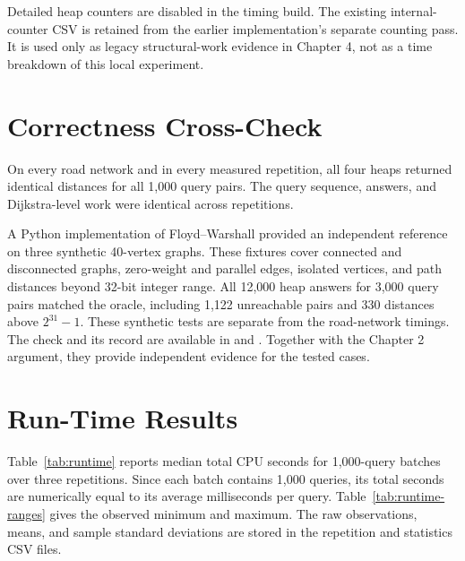\documentclass[12pt,a4paper]{report}
\begin{document}
Detailed heap counters are disabled in the timing build. The existing
internal-counter CSV is retained from the earlier implementation's separate
counting pass. It is used only as legacy structural-work evidence in
Chapter 4, not as a time breakdown of this local experiment.

\section{Correctness Cross-Check}
On every road network and in every measured repetition, all four heaps
returned identical distances for all 1,000 query pairs. The query sequence,
answers, and Dijkstra-level work were identical across repetitions.

A Python implementation of Floyd--Warshall provided an independent
reference on three synthetic 40-vertex graphs. These fixtures
cover connected and disconnected graphs, zero-weight and parallel edges,
isolated vertices, and path distances beyond 32-bit integer range.
All 12,000 heap answers for 3,000 query pairs matched the oracle, including
1,122 unreachable pairs and 330 distances above $2^{31}-1$.
These synthetic tests are separate from the road-network timings.
The check and its record are available in
 and .
Together with the Chapter 2 argument, they provide independent evidence for
the tested cases.

\section{Run-Time Results}
Table~\ref{tab:runtime} reports median total CPU seconds for 1,000-query
batches over three repetitions. Since each batch contains 1,000 queries,
its total seconds are numerically equal to its average milliseconds per
query. Table~\ref{tab:runtime-ranges} gives the observed minimum and maximum.
The raw observations, means, and sample standard deviations are stored in
the repetition and statistics CSV files.
\end{document}
